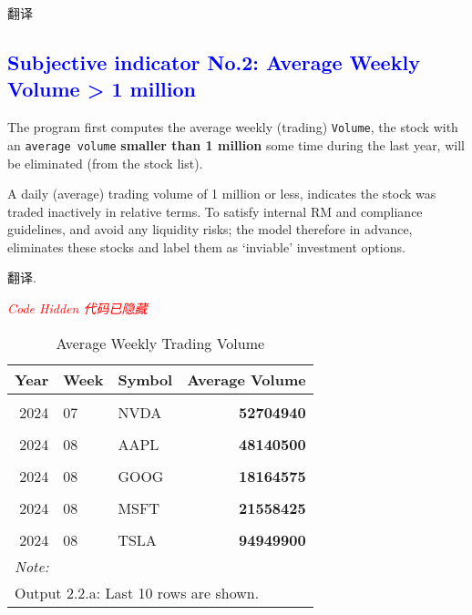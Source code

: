 \documentclass[
]{book}
\begin{document}
翻译

\hypertarget{section-1}{%
\subsection{\texorpdfstring{\textcolor{blue}{Subjective indicator No.2: Average Weekly Volume > 1 million}}{}}\label{section-1}}

The program first computes the average weekly (trading) \texttt{Volume},
the stock with an \texttt{average\ volume} \textbf{smaller than 1
million} some time during the last year, will be eliminated (from the
stock list).

A daily (average) trading volume of 1 million or less, indicates the
stock was traded inactively in relative terms. To satisfy internal RM
and compliance guidelines, and avoid any liquidity risks; the model
therefore in advance, eliminates these stocks and label them as
`inviable' investment options.

翻译.

\emph{\textcolor{red}{Code Hidden 代码已隐藏}}

\begin{longtable}[t]{rll>{}r}
\caption{\label{tab:unnamed-chunk-13}Average Weekly Trading Volume}\\
\toprule
Year & Week & Symbol & Average Volume\\
\midrule
\cellcolor{gray!10}{2024} & \cellcolor{gray!10}{07} & \cellcolor{gray!10}{MSFT} & \textbf{\cellcolor{gray!10}{22707120}}\\
2024 & 07 & NVDA & \textbf{52704940}\\
\cellcolor{gray!10}{2024} & \cellcolor{gray!10}{07} & \cellcolor{gray!10}{TSLA} & \textbf{\cellcolor{gray!10}{99093300}}\\
2024 & 08 & AAPL & \textbf{48140500}\\
\cellcolor{gray!10}{2024} & \cellcolor{gray!10}{08} & \cellcolor{gray!10}{AMZN} & \textbf{\cellcolor{gray!10}{50402800}}\\
2024 & 08 & GOOG & \textbf{18164575}\\
\cellcolor{gray!10}{2024} & \cellcolor{gray!10}{08} & \cellcolor{gray!10}{META} & \textbf{\cellcolor{gray!10}{17619875}}\\
2024 & 08 & MSFT & \textbf{21558425}\\
\cellcolor{gray!10}{2024} & \cellcolor{gray!10}{08} & \cellcolor{gray!10}{NVDA} & \textbf{\cellcolor{gray!10}{77183575}}\\
2024 & 08 & TSLA & \textbf{94949900}\\
\bottomrule
\multicolumn{4}{l}{\rule{0pt}{1em}\textit{Note: }}\\
\multicolumn{4}{l}{\rule{0pt}{1em}Output 2.2.a: Last 10 rows are shown.}\\
\end{longtable}
\end{document}
